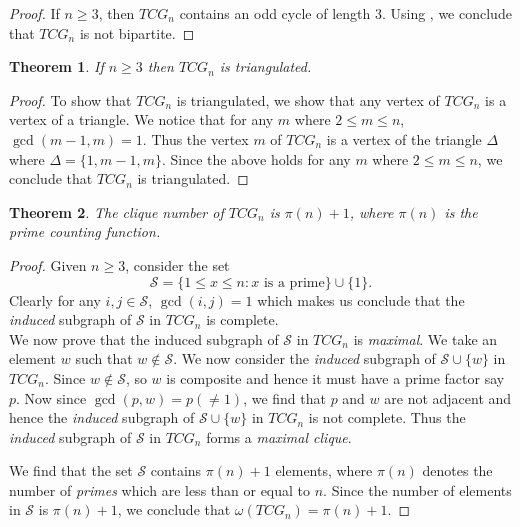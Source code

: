 \documentclass[12pt]{article}
\newtheorem{theorem}{Theorem}[section]
\begin{document}
	
	\begin{proof}
		If $n\ge 3$, then $TCG_n$ contains an odd cycle of length $3$.
		Using , we conclude that $TCG_n$ is not bipartite.
	\end{proof}
	
	
	
	\begin{theorem}
		If $n\ge 3$ then $TCG_n$ is triangulated.
	\end{theorem}
	
	\begin{proof}
		To show that $TCG_n$ is triangulated, we show that any vertex of $TCG_n$ is a vertex of a triangle.
		We notice that for any $m$ where $2\le m\le n$, $\gcd(m-1,m)=1$.
		Thus the vertex $m$ of $TCG_n$ is a vertex of the triangle $\Delta$ where $\Delta=\{1,m-1,m\}$. 
		Since the above holds for any $m$ where $2\le m\le n$, we conclude that $TCG_n$ is triangulated.
	\end{proof}
	
	
	\begin{theorem}
		\label{clique}
		The clique number of $TCG_n$  is $\pi(n)+1$, where $\pi(n)$ is the prime counting function.
	\end{theorem}
	
	
	\begin{proof}
		Given $n\ge 3$, consider the set $$\mathcal{S}=\{1\le x\le n: x \text{ is a prime} \}\cup \{1\}.$$
		Clearly for any $i,j\in \mathcal{S}$,  $\gcd(i,j)=1$ which makes us  conclude that  the \textit{induced} subgraph of $\mathcal{S}$ in $TCG_n$ is complete.
		\\
		We now prove that the induced subgraph of $\mathcal{S}$ in $TCG_n$ is \textit{maximal}.
		We take an element $w$ such that $w\notin \mathcal{S}$.
		We now consider  the \textit{induced} subgraph of $\mathcal{S}\cup \{w\}$ in $TCG_n$.
		Since $w\notin \mathcal{S}$, so $w$ is composite and hence it must have a prime factor say $p$.
		Now since $\gcd(p,w)=p(\neq 1)$, we find that $p$ and $w$ are not adjacent and hence the  \textit{induced} subgraph of $\mathcal{S}\cup \{w\}$ in $TCG_n$ is not complete.
		Thus the \textit{induced} subgraph of $\mathcal{S}$ in $TCG_n$ forms a \textit{maximal clique}.
		
		We find that the set $\mathcal{S}$ contains $\pi(n)+1$ elements, where  $\pi(n)$  denotes the number of \textit{primes} which are less than or equal to $n$.
		Since the number of elements in $\mathcal{S}$ is $\pi(n)+1$,  we conclude that $\omega(TCG_n)=\pi(n)+1$.
		
		
	\end{proof}
	
\end{document}
